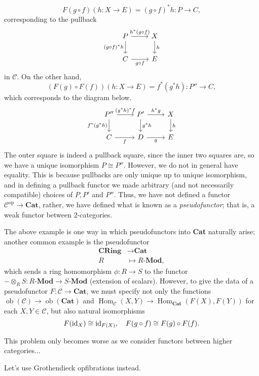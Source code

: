 \documentclass{MetricNotes2023}
\def\id{\ensuremath\text{id}}
\DeclareMathOperator{\Hom}{Hom}
\DeclareMathOperator{\ob}{ob}
\begin{document}
\[F(g \circ f)(h : X \to E)=(g\circ f)^*h : P \to C,\] corresponding to the pullback
\[\begin{tikzcd}
P \arrow[r, "h^*(g\circ f)"] \arrow[d, swap, "(g \circ f)^*h"]  & X \arrow[d, "h"]  \\
C \arrow[r, swap, "g\circ f"]  & E
\end{tikzcd}\]
in \(\mathcal{C}\). On the other hand, 
\[(F(g)\circ F(f))(h : X \to E)=f^*(g^*h) : P'' \to C,\] which corresponds to the diagram below.
\[\begin{tikzcd}
P'' \arrow[r, "(g^*h)^*f"] \arrow[d, swap, "f^*(g^*h)"]  & P' \arrow[r, "h^*g"] \arrow[d, "g^*h"] & X \arrow[d, "h"]  \\
C \arrow[r, swap, "f"]  & D \arrow[r, swap, "g"] & E
\end{tikzcd}\]
The outer square is indeed a pullback square, since the inner two squares are, so we have a unique isomorphism \(P \cong P''\). However, we do not in general have equality. This is because pullbacks are only unique up to unique isomorphism, and in defining a pullback functor we made arbitrary (and not necessarily compatible) choices of \(P, P'\) and \(P''\). Thus, we have not defined a functor \(\mathcal{C}^{\text{op}}\to \textbf{Cat}\), rather, we have defined what is known as a \textit{pseudofunctor}; that is, a weak functor between 2-categories. 

The above example is one way in which pseudofunctors into \textbf{Cat} naturally arise; another common example is the pseudofunctor
\begin{align*}
\textbf{CRing}&\to \textbf{Cat}\\
R\; &\mapsto R \textbf{-Mod},
\end{align*}
which sends a ring homomorphism \(\phi : R \to S\) to the functor \(-\otimes_R S : R \textbf{-Mod}\to S \textbf{-Mod}\) (extension of scalars). However, to give the data of a pseudofunctor \(F : \mathcal{C} \to \textbf{Cat}\), we must specify not only the functions \(\ob(\mathcal{C})\to \ob(\textbf{Cat})\) and \(\Hom_\mathcal{C}(X, Y)\to \Hom_\textbf{Cat}(F(X), F(Y))\) for each \(X, Y \in \mathcal{C}\), but also natural isomorphisms
\[F(\id_X) \cong \id_{F(X)}, \quad F(g \circ f) \cong F(g) \circ F(f).\]

This problem only becomes worse as we consider functors between higher categories...

Let's use Grothendieck opfibrations instead.
\end{document}
